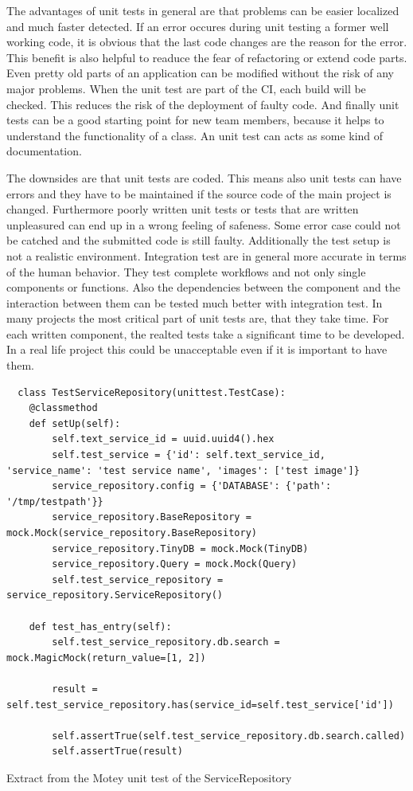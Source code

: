 The advantages of unit tests in general are that problems can be easier localized and much faster detected.
If an error occures during unit testing a former well working code, it is obvious that the last code changes are the reason for the error.
This benefit is also helpful to readuce the fear of refactoring or extend code parts.
Even pretty old parts of an application can be modified without the risk of any major problems.
When the unit test are part of the \ac{CI}, each build will be checked.
This reduces the risk of the deployment of faulty code.
And finally unit tests can be a good starting point for new team members, because it helps to understand the functionality of a class.
An unit test can acts as some kind of documentation.

The downsides are that unit tests are coded.
This means also unit tests can have errors and they have to be maintained if the source code of the main project is changed.
Furthermore poorly written unit tests or tests that are written unpleasured can end up in a wrong feeling of safeness.
Some error case could not be catched and the submitted code is still faulty.
Additionally the test setup is not a realistic environment.
Integration test are in general more accurate in terms of the human behavior.
They test complete workflows and not only single components or functions.
Also the dependencies between the component and the interaction between them can be tested much better with integration test.
In many projects the most critical part of unit tests are, that they take time.
For each written component, the realted tests take a significant time to be developed.
In a real life project this could be unacceptable even if it is important to have them.\newline

\begin{listing}[H]
  \begin{verbatim}
  class TestServiceRepository(unittest.TestCase):
    @classmethod
    def setUp(self):
        self.text_service_id = uuid.uuid4().hex
        self.test_service = {'id': self.text_service_id, 'service_name': 'test service name', 'images': ['test image']}
        service_repository.config = {'DATABASE': {'path': '/tmp/testpath'}}
        service_repository.BaseRepository = mock.Mock(service_repository.BaseRepository)
        service_repository.TinyDB = mock.Mock(TinyDB)
        service_repository.Query = mock.Mock(Query)
        self.test_service_repository = service_repository.ServiceRepository()

    def test_has_entry(self):
        self.test_service_repository.db.search = mock.MagicMock(return_value=[1, 2])

        result = self.test_service_repository.has(service_id=self.test_service['id'])

        self.assertTrue(self.test_service_repository.db.search.called)
        self.assertTrue(result)
  \end{verbatim}
  \caption{Extract from the Motey unit test of the ServiceRepository}
  \label{code:sample_unit_test}
\end{listing}

